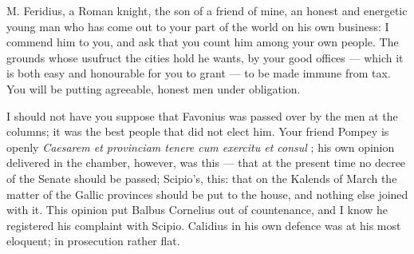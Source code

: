  M. Feridius, a Roman knight, the son of a friend of mine, an honest and energetic young man who has come out to your part of the world on his own business: I commend him to you, and ask that you count him among your own people. The grounds whose usufruct the cities hold he wants, by your good offices --- which it is both easy and honourable for you to grant --- to be made immune from tax. You will be putting agreeable, honest men under obligation.

 I should not have you suppose that Favonius was passed over by the men at the columns; it was the best people that did not elect him. Your friend Pompey is openly \textdagger \textit{Caesarem et provinciam tenere cum exercitu et consul} \textdagger; his own opinion delivered in the chamber, however, was this --- that at the present time no decree of the Senate should be passed; Scipio's, this: that on the Kalends of March the matter of the Gallic provinces should be put to the house, and nothing else joined with it. This opinion put Balbus Cornelius out of countenance, and I know he registered his complaint with Scipio. Calidius in his own defence was at his most eloquent; in prosecution rather flat.
